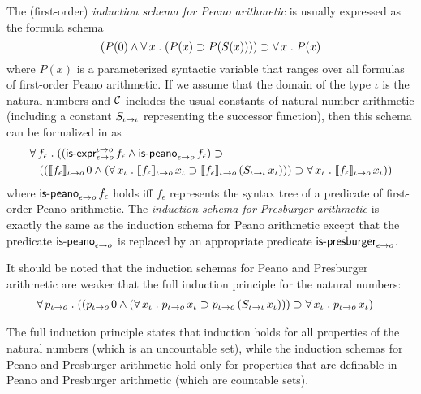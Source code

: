\documentclass[fleqn]{llncs}
\begin{document}
The (first-order) \emph{induction schema for Peano arithmetic} is
usually expressed as the formula schema
\[(P(0) \wedge \forall\, x \mathrel. (P(x) \supset P(S(x)))) \supset 
\forall\, x \mathrel. P(x)\] where $P(x)$ is a parameterized syntactic
variable that ranges over all formulas of first-order Peano
arithmetic.  If we assume that the domain of the type $\iota$ is the
natural numbers and $\mbox{$\cal C$}$ includes the usual constants of natural
number arithmetic (including a constant $S_{\iota \rightarrow
  \iota}$ representing the successor function), then this schema can
be formalized in {\churchqe} as
\begin{align*}
&
\forall\, f_\epsilon \mathrel. 
((\mbox{\sf is-expr}_{\epsilon \rightarrow o}^{\iota \rightarrow o} \, f_\epsilon \wedge
\mbox{\sf is-peano}_{\epsilon \rightarrow o} \, f_\epsilon) \supset {} \\
&
\hspace*{2ex}
((\llbracket f_\epsilon\rrbracket_{\iota \rightarrow o} \, 0 \wedge
(\forall\, x_\iota \mathrel. \llbracket f_\epsilon\rrbracket_{\iota \rightarrow o} \, x_\iota \supset
\llbracket f_\epsilon\rrbracket_{\iota \rightarrow o} \, 
(S_{\iota \rightarrow \iota} \, x_\iota)))
\supset 
\forall\, x_\iota \mathrel. \llbracket f_\epsilon\rrbracket_{\iota \rightarrow o} \, x_\iota))
\end{align*}
where $\mbox{\sf is-peano}_{\epsilon \rightarrow o} \, f_\epsilon$ holds iff
$f_\epsilon$ represents the syntax tree of a predicate of
first-order Peano arithmetic.  The \emph{induction schema for
  Presburger arithmetic} is exactly the same as the induction schema
for Peano arithmetic except that the predicate
$\mbox{\sf is-peano}_{\epsilon \rightarrow o}$ is replaced by an appropriate
predicate $\mbox{\sf is-presburger}_{\epsilon \rightarrow o}$.

It should be noted that the induction schemas for Peano and Presburger
arithmetic are weaker that the full induction principle for the
natural numbers:
\begin{align*}
&
\forall\, p_{\iota \rightarrow o} \mathrel. 
((p_{\iota \rightarrow o} \, 0 \wedge
(\forall\, x_\iota \mathrel. p_{\iota \rightarrow o} \, x_\iota \supset
p_{\iota \rightarrow o} \, (S_{\iota \rightarrow \iota} \, x_\iota)))
\supset 
\forall\, x_\iota \mathrel. p_{\iota \rightarrow o} \, x_\iota)
\end{align*}

\noindent
The full induction principle states that induction holds for all
properties of the natural numbers (which is an uncountable set), while
the induction schemas for Peano and Presburger arithmetic hold only
for properties that are definable in Peano and Presburger arithmetic
(which are countable sets).
\end{document}
